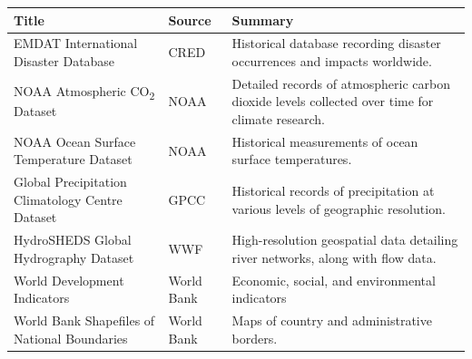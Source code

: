 \begin{table}[htbp]
\centering
{}
\label{tab:data_sources}
\small
\begin{tabular}{L{4cm}L{2cm}L{7cm}}
\toprule
\textbf{Title} & \textbf{Source} & \textbf{Summary} \\
\midrule
EMDAT International Disaster Database & CRED & Historical database recording disaster occurrences and impacts worldwide. \\
NOAA Atmospheric CO\textsubscript{2} Dataset & NOAA & Detailed records of atmospheric carbon dioxide levels collected over time for climate research. \\
NOAA Ocean Surface Temperature Dataset & NOAA & Historical measurements of ocean surface temperatures. \\
Global Precipitation Climatology Centre Dataset & GPCC & Historical records of precipitation at various levels of geographic resolution. \\
HydroSHEDS Global Hydrography Dataset & WWF & High-resolution geospatial data detailing river networks, along with flow data. \\
World Development Indicators & World Bank & Economic, social, and environmental indicators \\
World Bank Shapefiles of National Boundaries & World Bank & Maps of country and administrative borders. \\
\bottomrule
\end{tabular}
\end{table}
